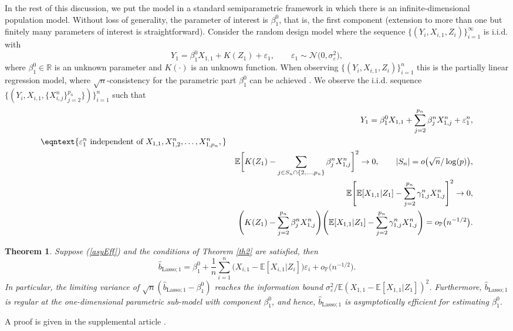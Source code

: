\documentclass[aos,MSNbibl,dvips]{arximspdf}
\def\cal{\mathcal}
\newcommand{\eqref}[1]{(\ref{#1})}
\newtheorem{theo}{Theorem}[section]
\newcommand{\PP}{\mathbb{P}}
\newcommand{\EE}{\mathbb{E}}
\newcommand{\R}{\mathbb{R}}
\newcommand{\eps}{\varepsilon}
\def\summ#1#2#3{\sum_{#1=#2}^{#3}}
\begin{document}
In the rest of this
discussion, we put the model in a standard semiparametric framework
in which there is an infinite-dimensional population model.
Without loss of generality, the parameter of interest is $\beta^0_1$,
that is, the first component (extension to more than one but finitely many
parameters of interest is straightforward). Consider the random design
model where
the sequence $\{(Y_i, X_{i,1}, Z_i ) \}_{i=1}^{\infty}$ is i.i.d. with
%
\begin{equation}
\label{modsemip2} Y_1 = \beta^0_1X_{1,1}+K(Z_1)
+ \eps_1,\qquad \eps_1 \sim{\cal N}\bigl(0,
\sigma^2_{\eps}\bigr),
\end{equation}
%
where $\beta_1^0 \in\R$ is an unknown parameter and $K (\cdot)$ is an
unknown function.
When observing $\{(Y_i, X_{i,1}, Z_i ) \}_{i=1}^n$ this is the
partially linear regression model, where $\sqrt n$-consistency for
the parametric part $\beta_1^0$ can be achieved \cite{robinson1988root}.
We
observe the i.i.d. sequence $\{ (Y_i, X_{i,1}, \{ X_{i,j}^n \}
_{j=2}^{p_n} \} )\}_{i=1}^n $
such that
%
\begin{eqnarray}
\label{asyEff} \qquad&& Y_1 = \beta_1^0
X_{1,1}+ \summ j2{p_n} \beta^{n}_j
X_{1,j}^n+\eps _1^n,
 \nonumber\\
\eqntext{\eps_1^n\mbox{ independent of } X_{1,1},
X_{1,2}^n, \ldots,X_{1,p_n}^n,}
\\
&&
\EE \biggl[ K(Z_1)-\sum_{j \in S_n \cap\{ 2, \ldots,
p_n\} }
\beta^n_jX_{1,j}^n \biggr]
^2 \rightarrow0, \qquad|S_n | = o\bigl(\sqrt n / \log(p)\bigr),
\\
&& \EE \Biggl[ \EE[X_{1,1}|Z_1]-\summ j2{p_n}
\gamma^n_{1,j} X_{1,j}^n
\Biggr]^2 \rightarrow0,\nonumber
\\
&&\Biggl(K(Z_1)-\summ j2{p_n} \beta^n_jX_{1,j}^n
\Biggr) \Biggl(\EE[X_{1,1}|Z_1]-\summ j2{p_n}
\gamma^n_{1,j}X_{1,j}^n \Biggr)=
o_{\PP}\bigl(n^{-1/2}\bigr).\nonumber
\end{eqnarray}

\begin{theo}\label{thspj}
Suppose \eqref{asyEff} and the conditions of Theorem \ref{th2} are
satisfied, then
%
\[
\hat{b}_{\mathrm{Lasso};1}=\beta^0_1+\frac{1}n
\summ i1n \bigl(X_{i,1}-\EE[X_{i,1}|Z_i] \bigr)
\eps_i+o_{\PP}\bigl(n^{-1/2}\bigr).
\]
%
In particular, the limiting variance of
$\sqrt{n}(\hat{b}_{\mathrm{Lasso};1} - \beta^0_1)$ reaches the information
bound $\sigma^2_{\eps}/\EE(X_{1,1} - \EE[X_{1,1}|Z_1])^2$. Furthermore,
$\hat{b}_{\mathrm{Lasso};1}$ is regular at the one-dimensional parametric
sub-model with component $\beta_1^0$, and hence, $\hat{b}_{\mathrm{Lasso};1}$
is asymptotically efficient for estimating $\beta_1^0$.
\end{theo}
%
A proof is given in the supplemental article \cite{supplement}.
\end{document}
